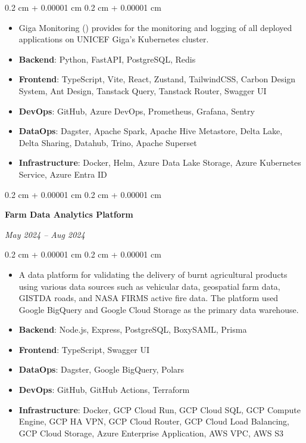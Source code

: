 \documentclass[10pt, a4paper]{article}
\newenvironment{highlights}{
    \begin{itemize}[
        topsep=0.10 cm,
        parsep=0.10 cm,
        partopsep=0pt,
        itemsep=0pt,
        leftmargin=0.4 cm + 10pt
    ]
}{
    \end{itemize}
} %
\newenvironment{onecolentry}{
    \begin{adjustwidth}{
        0.2 cm + 0.00001 cm
    }{
        0.2 cm + 0.00001 cm
    }
}{
    \end{adjustwidth}
} %
\newenvironment{twocolentry}[2][]{
    \onecolentry
    \def\secondColumn{#2}
    \setcolumnwidth{\fill, 4.5 cm}
    \begin{paracol}{2}
}{
    \switchcolumn \raggedleft \secondColumn
    \end{paracol}
    \endonecolentry
} %
\let\hrefWithoutArrow\href
\renewcommand{\href}[2]{\hrefWithoutArrow{#1}{\ifthenelse{\equal{#2}{}}{ }{#2 }\raisebox{.15ex}{\footnotesize \faExternalLink*}}}
\begin{document}
\begin{onecolentry}
\begin{highlights}
                \item Giga Monitoring (\href{https://github.com/unicef/giga-monitoring}{GitHub}) provides for the monitoring and  logging of all deployed applications on UNICEF Giga's Kubernetes cluster.

                \item \textbf{Backend}: Python, FastAPI, PostgreSQL, Redis
                \item \textbf{Frontend}: TypeScript, Vite, React, Zustand, TailwindCSS, Carbon Design System, Ant Design,  Tanstack Query, Tanstack Router, Swagger UI

                \item \textbf{DevOps}: GitHub, Azure DevOps, Prometheus, Grafana, Sentry
                \item \textbf{DataOps}: Dagster, Apache Spark, Apache Hive Metastore, Delta Lake, Delta Sharing, Datahub, Trino,  Apache Superset

                \item \textbf{Infrastructure}: Docker, Helm, Azure Data Lake Storage, Azure Kubernetes Service, Azure Entra ID
            \end{highlights}
        \end{onecolentry}


        \vspace{0.2 cm}

        \begin{twocolentry}{
            
            
        \textit{May 2024 – Aug 2024}}
            \textbf{Farm Data Analytics Platform}
        \end{twocolentry}

        \vspace{0.10 cm}
        \begin{onecolentry}
            \begin{highlights}
                \item A data platform for validating the delivery of burnt agricultural products using various data sources such as vehicular data, geospatial farm data, GISTDA roads, and NASA FIRMS active fire data. The platform used Google BigQuery and Google Cloud Storage as the primary data warehouse.
                \item \textbf{Backend}: Node.js, Express, PostgreSQL, BoxySAML, Prisma
                \item \textbf{Frontend}: TypeScript, Swagger UI
                \item \textbf{DataOps}: Dagster, Google BigQuery, Polars
                \item \textbf{DevOps}: GitHub, GitHub Actions, Terraform
                \item \textbf{Infrastructure}: Docker, GCP Cloud Run, GCP Cloud SQL, GCP Compute Engine, GCP HA VPN, GCP Cloud Router, GCP Cloud Load Balancing, GCP Cloud Storage, Azure Enterprise Application,  AWS VPC, AWS S3

            \end{highlights}
        \end{onecolentry}
\end{document}

